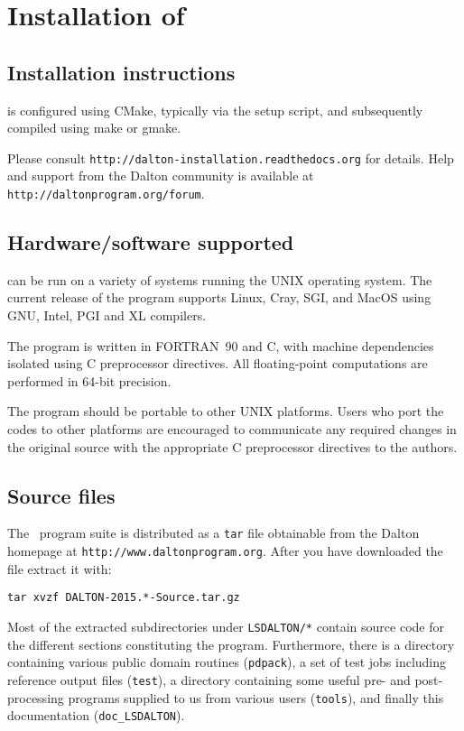 \chapter{Installation of \lsdalton}\label{ch:install}

\section{Installation instructions}\label{sec:cmake-installation}

{\lsdalton} is configured using CMake, typically via the setup script,
and subsequently compiled using make or gmake.

Please consult \verb|http://dalton-installation.readthedocs.org| for details.
Help and support from the Dalton community is available at \verb|http://daltonprogram.org/forum|.

\section{Hardware/software supported}
{\lsdalton} can be run on a variety of systems running the UNIX operating system.
The current release of the program supports Linux, Cray, SGI,
and MacOS using GNU, Intel, PGI and XL compilers.

The program is written in FORTRAN~90 and C, with machine dependencies
isolated using C preprocessor directives.  All
floating-point computations are performed in 64-bit precision.

The program should be portable to other UNIX platforms.  Users
who port the codes to other platforms are encouraged to communicate any
required changes in the original source with the appropriate C preprocessor
directives to the authors.

\section{Source files}\label{sec:source}

The \latestrelease\ program suite is distributed as a \verb|tar|
file obtainable from
the Dalton homepage at \verb|http://www.daltonprogram.org|.
After you have downloaded the file extract it with:
\begin{verbatim}
tar xvzf DALTON-2015.*-Source.tar.gz
\end{verbatim}
Most of the extracted subdirectories under \verb|LSDALTON/*| contain source code for the different
sections constituting the {\lsdalton} program.
Furthermore, there is a directory containing various public domain routines (\verb|pdpack|), a set of test jobs including reference output files (\verb|test|), a directory
containing some useful pre- and post-processing programs supplied to us from
various users (\verb|tools|), and finally this documentation (\verb|doc_LSDALTON|). 

